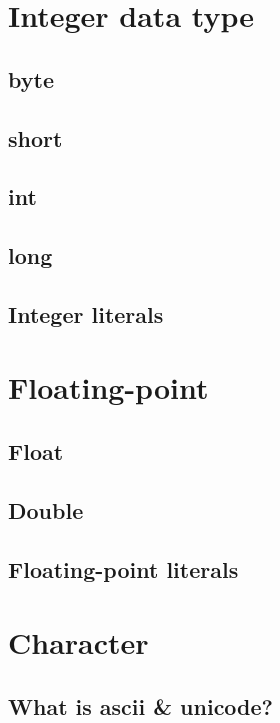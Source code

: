 \documentclass[14pt,fleqn]{extbook} %
\begin{document}
\section{Integer data type}
%
\subsection{byte}

\subsection{short}

\subsection{int}

\subsection{long}

\subsection{Integer literals}

\section{Floating-point}

\subsection{Float}

\subsection{Double}

\subsection{Floating-point literals}

\section{Character}

\subsection{What is ascii \& unicode?}

\end{document}
